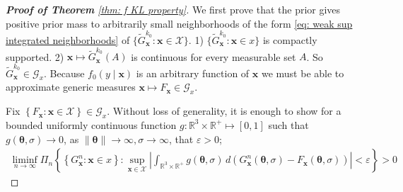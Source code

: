 \begin{proof}[\hypertarget{proof of thm KL property}{\textbf{Proof of Theorem}} \ref{thm: f KL property}]
We first prove that the prior gives positive prior mass to arbitrarily small neighborhoods of the form \eqref{eq: weak sup integrated neighborhoods} of $\{\tilde{G}^{k_0}_{\boldsymbol{x}}: \boldsymbol{x} \in \mathcal{X} \}$.
1) $\{\tilde{G}^{k_0}_{\boldsymbol{x}} : \boldsymbol{x} \in x\}$ is compactly supported.
2) $\boldsymbol{x} \mapsto \tilde{G}^{k_0}_{ \boldsymbol{x}}(A)$ is continuous for every measurable set $A$. So $\tilde{G}^{k_0}_{\boldsymbol{x}} \in \mathscr{G}_x$. Because $f_0( y \mid \boldsymbol{x})$ is an arbitrary function of $\boldsymbol{x}$ we must be able to approximate generic measures $\boldsymbol{x} \mapsto F_{\boldsymbol{x}} \in \mathscr{G}_x$.

Fix $\left\{F_{\boldsymbol{x}}: \boldsymbol{x} \in \mathcal{X}\right\} \in \mathscr{G}_x$. Without loss of generality, it is  enough to show for a bounded uniformly continuous function $g: \mathbb{R}^3 \times \mathbb{R}^{+}  \mapsto [0,1]$ such that $ g(\boldsymbol{\theta}, \sigma) \rightarrow 0$, as $\| \boldsymbol{\theta} \| \rightarrow \infty, \sigma \rightarrow \infty$, that $\varepsilon>0$;
\begin{align}\label{eq: prior support}
\liminf_{n \rightarrow \infty} \Pi_n \left\{\left\{G_{\boldsymbol{x}}^n: \boldsymbol{x} \in x\right\}: \sup_{\boldsymbol{x} \in \mathcal{X}}\left|\int_{\mathbb{R}^3 \times \mathbb{R}^+} g(\boldsymbol{\theta}, \sigma ) \, d\left(G_{\boldsymbol{x}}^n(\boldsymbol{\theta}, \sigma)-F_{\boldsymbol{x}}(\boldsymbol{\theta}, \sigma)\right)\right| <\varepsilon\right\}>0
\end{align}


\end{proof}
